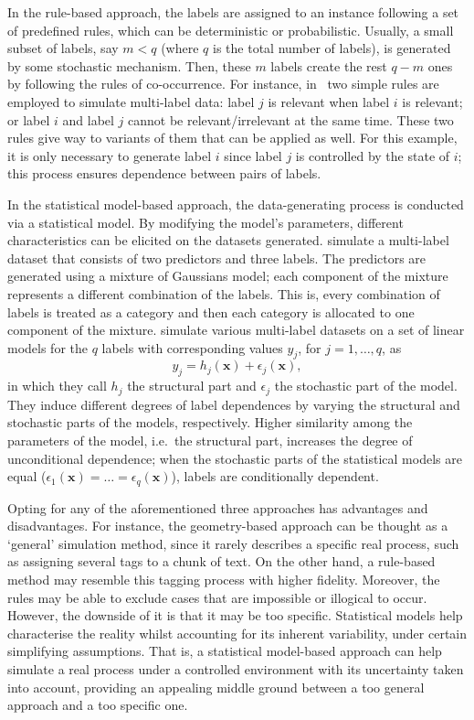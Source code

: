 \documentclass[review]{elsarticle}
\begin{document}
	In the rule-based approach, the labels are assigned to an instance following a set of predefined rules, which can be deterministic or probabilistic. Usually, a small subset of labels, say $m < q$ (where $q$ is the total number of labels), is generated by some stochastic mechanism. Then, these $m$ labels create the rest $q-m$ ones by following the rules of co-occurrence. For instance, in~\cite{EG3} two simple rules are employed to simulate multi-label data: label $j$ is relevant when label $i$ is relevant; or label $i$ and label $j$ cannot be relevant/irrelevant at the same time. These two rules give way to variants of them that can be applied as well. For this example, it is only necessary to generate label $i$ since label $j$ is controlled by the state of $i$; this process ensures dependence between pairs of labels.
	
	In the statistical model-based approach, the data-generating process is conducted via a statistical model. By modifying the model's parameters, different characteristics can be elicited on the datasets generated. \citet{EG2} simulate a multi-label dataset that consists of two predictors and three labels. The predictors are generated using a mixture of Gaussians model; each component of the mixture represents a different combination of the labels. This is, every combination of labels is treated as a category and then each category is allocated to one component of the mixture.
	\citet{EG1} simulate various multi-label datasets on a set of linear models for the $q$ labels with corresponding values $y_j$, for $j = 1,\ldots,q$, as
	\begin{displaymath}
	y_{j} = h_{j}\left( \mathbf{x} \right) + \epsilon_{j} \left( \mathbf{x} \right),
	\end{displaymath} 
	in which they call $h_{j}$ the structural part and $\epsilon_{j}$ the stochastic part of the model. They induce different degrees of label dependences by varying the structural and stochastic parts of the models, respectively. Higher similarity among the parameters of the model, i.e.~the structural part, increases the degree of unconditional dependence; when the stochastic parts of the statistical models are equal ($\epsilon_{1}(\mathbf{x}) = \ldots = \epsilon_{q}(\mathbf{x})$), labels are conditionally dependent. 
	
	Opting for any of the aforementioned three approaches has advantages and disadvantages. For instance, the geometry-based approach can be thought as a `general' simulation method, since it rarely describes a specific real process, such as assigning several tags to a chunk of text. On the other hand, a rule-based method may resemble this tagging process with higher fidelity. Moreover, the rules may be able to exclude cases that are impossible or illogical to occur. However, the downside of it is that it may be too specific.
	Statistical models help characterise the reality whilst accounting for its inherent variability, under certain simplifying assumptions. That is, a statistical model-based approach can help simulate a real process under a controlled environment with its uncertainty taken into account, providing an appealing middle ground between a too general approach and a too specific one. 
	
\end{document}
